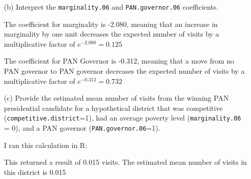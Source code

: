 \documentclass[12pt,letterpaper]{article}
\begin{document}
\begin{enumerate}
	\item [(b)]
	Interpret the \texttt{marginality.06} and \texttt{PAN.governor.06} coefficients.
	
	The coefficient for marginality is -2.080, meaning that an increase in marginality by one unit decreases the expected number of visits by a multiplicative factor of $e^{-2.080} = 0.125$
	
	The coefficient for PAN Governor is -0.312, meaning that a move from no PAN governor to PAN governor decreases the expected number of visits by a multiplicative factor of $e^{-0.312} = 0.732$
	
	\item [(c)]
	Provide the estimated mean number of visits from the winning PAN presidential candidate for a hypothetical district that was competitive (\texttt{competitive.district}=1), had an average poverty level (\texttt{marginality.06} = 0), and a PAN governor (\texttt{PAN.governor.06}=1).
	
	I ran this calculation in R:
	 
	
	This returned a result of 0.015 visits. The estimated mean number of visits in this district is 0.015
	
\end{enumerate}
\end{document}
